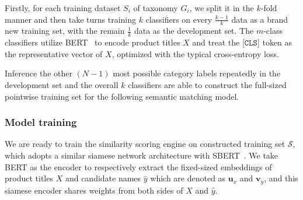 Firstly, for each training dataset $S_i$ of taxonomy $G_i$, 
we split it in the $k$-fold manner and then take turns training $k$ classifiers on every $\frac{k-1}{k}$ data as a brand new training set, with the remain $\frac{1}{k}$ data as the development set. The $m$-class classifiers utilize BERT~\cite{devlin-etal-2019-bert} to encode product titles $X$ 
and treat the [$\mathtt{CLS}$] token as the representative vector of $X$, optimized with the typical cross-entropy loss. 

Inference the other $(N-1)$ most possible category labels repeatedly in the development set and the overall $k$ classifiers are able to construct the full-sized 
pointwise training set for the following semantic matching model.
\subsubsection{Model training}
We are ready to train the similarity scoring engine on constructed training set $\mathcal{S}$, which adopts a similar siamese network architecture with SBERT~\cite{reimers2019sentence}. We take BERT as the encoder to respectively extract the fixed-sized embeddings of product titles $X$ and candidate names $\hat{y}$ which are denoted as $\mathbf{u}_x$ and $\mathbf{v}_y$, and this siamese encoder shares weights from both sides of $X$ and $\hat{y}$. 


